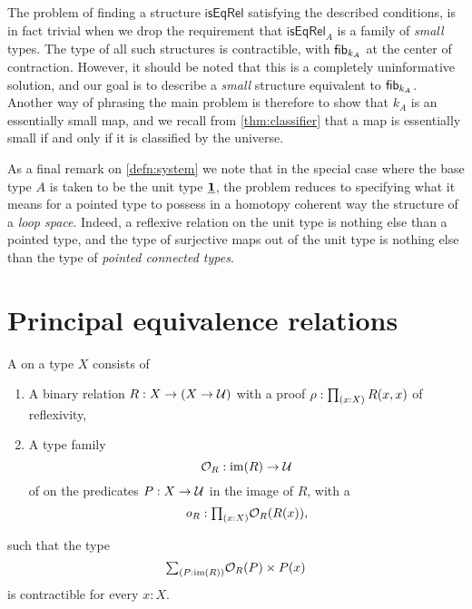 The problem of finding a structure $\mathsf{isEqRel}$ satisfying the described conditions, is in fact trivial when we drop the requirement that $\mathsf{isEqRel}_A$ is a family of \emph{small} types. The type of all such structures is contractible, with $\mathsf{fib}_{k_A}$ at the center of contraction. However, it should be noted that this is a completely uninformative solution, and our goal is to describe a \emph{small} structure equivalent to $\mathsf{fib}_{k_A}$. Another way of phrasing the main problem is therefore to show that $k_A$ is an essentially small map, and we recall from \cref{thm:classifier} that a map is essentially small if and only if it is classified by the universe.

As a final remark on \autoref{defn:system} we note that in the special case where the base type $A$ is taken to be the unit type $\underline{\mathbf{1}}$, the problem reduces to specifying what it means for a pointed type to possess in a homotopy coherent way the structure of a \emph{loop space}. Indeed, a reflexive relation on the unit type is nothing else than a pointed type, and the type of surjective maps out of the unit type is nothing else than the type of \emph{pointed connected types}.

\section{Principal equivalence relations}

\begin{defn}
A  on a type $X$ consists of
\begin{enumerate}
\item A binary relation $R:X\to (X\to \mathcal{U})$ with a proof $\rho:\prd{x:X}R(x,x)$ of reflexivity,
\item A type family
\begin{equation*}
\mathcal{O}_R : \operatorname{im}(R)\to\mathcal{U} \\
\end{equation*}
of  on the predicates $P:X\to \mathcal{U}$ in the image of $R$, with a 
\begin{equation*}
o_R : \prd{x:X}\mathcal{O}_R(R(x)),
\end{equation*}
\end{enumerate}
such that the type
\begin{equation*}
\sm{P:\im(R)}\mathcal{O}_R(P)\times P(x)
\end{equation*}
is contractible for every $x:X$. 
\end{defn}

